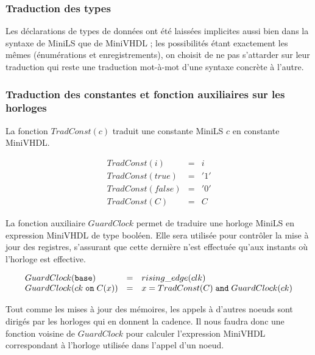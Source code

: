 \documentclass[a4paper]{article}
\newcommand{\minils}{{\sc MiniLS}}
\newcommand{\minivhdl}{{\sc MiniVHDL}}
\newcommand{\mybox}[1]{\mbox{\tt{#1}}}
\newcommand{\Base}[0]{\mybox{base}}
\newcommand{\On}[3]{#1 \; \mybox{on} \; #2 (#3)}
\begin{document}
\subsubsection{Traduction des types}

Les d\'eclarations de types de donn\'ees ont \'et\'e laiss\'ees implicites aussi
bien dans la syntaxe de \minils{} que de \minivhdl{} ; les
possibilit\'es \'etant exactement les m\^emes (\'enum\'erations et
enregistrements), on choisit de ne pas s'attarder sur leur traduction
qui reste une traduction mot-\`a-mot d'une syntaxe concr\`ete \`a l'autre.

\subsubsection{Traduction des constantes et fonction auxiliaires sur les horloges}

La fonction $TradConst(c)$ traduit une constante \minils{} $c$ en constante
\minivhdl{}.

\newcommand{\TradC}[1]{TradConst(#1)}

\[
\begin{array}{lcl}
  \TradC{i} & = & i \\
  \TradC{true} & = & '1' \\
  \TradC{false} & = & '0' \\
  \TradC{C} & = & C
\end{array}
\]

La fonction auxiliaire $GuardClock$ permet de traduire une horloge \minils{} en
expression \minivhdl{} de type bool\'een. Elle sera utilis\'ee pour contr\^oler la
mise \`a jour des registres, s'assurant que cette derni\`ere n'est effectu\'ee
qu'aux instants o\`u l'horloge est effective.

\newcommand{\GEC}[1]{GuardClock(#1)}

\[
\begin{array}{lcl}
  \GEC{\Base} & = & rising\_edge(clk) \\
  \GEC{\On{ck}{C}{x}} & = & x = \TradC{C} \; \mathtt{and} \; \GEC{ck}
\end{array}
\]

Tout comme les mises \`a jour des m\'emoires, les appels \`a d'autres noeuds
sont dirig\'es par les horloges qui en donnent la cadence. Il nous faudra donc
une fonction voisine de $GuardClock$ pour calculer l'expression \minivhdl{}
correspondant \`a l'horloge utilis\'ee dans l'appel d'un noeud.

\newcommand{\EC}[1]{ExpClock(#1)}
\end{document}
